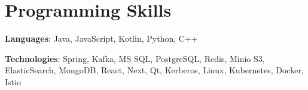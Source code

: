 

\section{Programming Skills}\label{sec:programming-skills}
\resumeSubHeadingListStart
\item{
    \textbf{Languages}{: Java, JavaScript, Kotlin, Python, C++}
}
\item{
    \textbf{Technologies}{: Spring, Kafka, MS SQL, PostgreSQL, Redis, Minio S3, ElasticSearch, MongoDB, React, Next, Qt, Kerberos, Linux, Kubernetes, Docker, Istio }
}
\resumeSubHeadingListEnd
